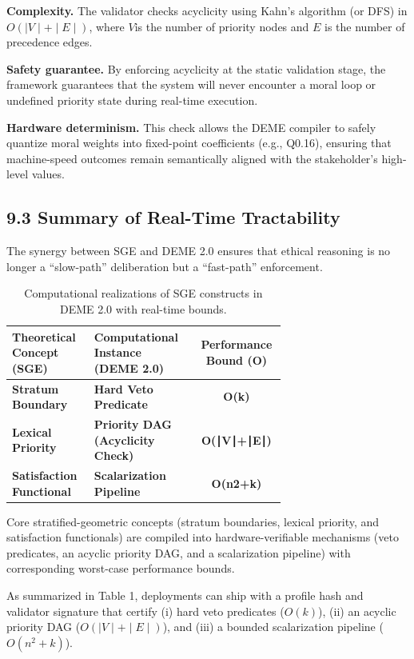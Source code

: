 \documentclass[12pt]{article}
\theoremstyle{plain}
\theoremstyle{definition}
\theoremstyle{remark}
\begin{document}
\textbf{Complexity.} The validator checks acyclicity using Kahn's
algorithm (or DFS) in \(O( \mid V \mid + \mid E \mid )\), where \(V\)is
the number of priority nodes and \(E\) is the number of precedence
edges.

\textbf{Safety guarantee.} By enforcing acyclicity at the static
validation stage, the framework guarantees that the system will never
encounter a moral loop or undefined priority state during real-time
execution.

\textbf{Hardware determinism.} This check allows the DEME compiler to
safely quantize moral weights into fixed-point coefficients (e.g.,
Q0.16), ensuring that machine-speed outcomes remain semantically aligned
with the stakeholder's high-level values.

\subsection{9.3 Summary of Real-Time
Tractability}\label{summary-of-real-time-tractability}

The synergy between SGE and DEME 2.0 ensures that ethical reasoning is
no longer a ``slow-path'' deliberation but a ``fast-path'' enforcement.

\begin{table}[t]
\centering
\caption{Computational realizations of SGE constructs in DEME 2.0 with real-time bounds.}
\begin{tabular}{p{0.30\linewidth} p{0.38\linewidth} c}
\toprule
\textbf{Theoretical Concept (SGE)} & \textbf{Computational Instance (DEME 2.0)} & \textbf{Performance Bound (O)} \\
\midrule
\textbf{Stratum Boundary} & \textbf{Hard Veto Predicate} &
\textbf{O(k)} \\
\textbf{Lexical Priority} & \textbf{Priority DAG (Acyclicity Check)} &
\textbf{O(∣V∣+∣E∣)} \\
\textbf{Satisfaction Functional} & \textbf{Scalarization Pipeline} &
\textbf{O(n2+k)} \\
\bottomrule
\end{tabular}
\end{table}

Core stratified-geometric concepts (stratum boundaries, lexical
priority, and satisfaction functionals) are compiled into
hardware-verifiable mechanisms (veto predicates, an acyclic priority
DAG, and a scalarization pipeline) with corresponding worst-case
performance bounds.

As summarized in Table 1, deployments can ship with a profile hash and
validator signature that certify (i) hard veto predicates (\(O(k)\)),
(ii) an acyclic priority DAG (\(O( \mid V \mid + \mid E \mid )\)), and
(iii) a bounded scalarization pipeline (\(O(n^{2} + k)\)).
\end{document}
